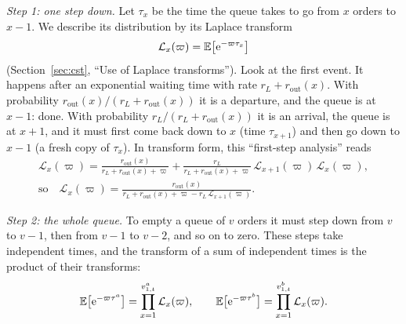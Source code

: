 \emph{Step 1: one step down.} Let $\tau_x$ be the time the queue takes to go from $x$ orders to $x-1$. We
describe its distribution by its Laplace transform 
\[
  \mathcal{L}_x(\varpi) = \mathbb{E}\big[\mathrm{e}^{-\varpi
\tau_x}\big]
\]
(Section~\ref{sec:cst}, ``Use of Laplace transforms''). Look at the first event. It happens
after an exponential waiting time with rate $r_L + r_{\text{out}}(x)$. With probability
$r_{\text{out}}(x)/(r_L + r_{\text{out}}(x))$ it is a departure, and the queue is at $x-1$: done. With
probability $r_L/(r_L + r_{\text{out}}(x))$ it is an arrival, the queue is at $x+1$, and it must first
come back down to $x$ (time $\tau_{x+1}$) and then go down to $x-1$ (a fresh copy of $\tau_x$). In
transform form, this ``first-step analysis'' reads
\begin{equation}
  \begin{gathered}
  \mathcal{L}_x(\varpi)
  = \frac{r_{\text{out}}(x)}{r_L + r_{\text{out}}(x) + \varpi}
  + \frac{r_L}{r_L + r_{\text{out}}(x) + \varpi}\,\mathcal{L}_{x+1}(\varpi)\,\mathcal{L}_x(\varpi),
  \\
  \text{so}\quad
  \mathcal{L}_x(\varpi) = \frac{r_{\text{out}}(x)}{r_L + r_{\text{out}}(x) + \varpi - r_L\,\mathcal{L}_{x+1}(\varpi)} .
  \end{gathered}
\end{equation}

\emph{Step 2: the whole queue.} To empty a queue of $v$ orders it must step down from $v$ to $v-1$, then
from $v-1$ to $v-2$, and so on to zero. These steps take independent times, and the transform of a sum of
independent times is the product of their transforms:
\begin{equation}
  \mathbb{E}\big[\mathrm{e}^{-\varpi \tau^a}\big] = \prod_{x=1}^{v^a_{1,t}} \mathcal{L}_x(\varpi), \qquad
  \mathbb{E}\big[\mathrm{e}^{-\varpi \tau^b}\big] = \prod_{x=1}^{v^b_{1,t}} \mathcal{L}_x(\varpi).
\end{equation}

